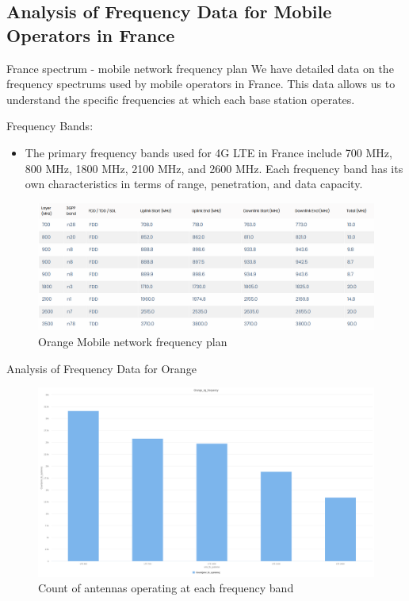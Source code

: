 \smallframetitle

\subsection{Analysis of Frequency Data for Mobile Operators in France}
\insertsubsectionframe

\begin{frame}{France spectrum - mobile network frequency plan}
    We have detailed data on the frequency spectrums used by mobile operators in France. This data allows us to understand the specific frequencies at which each base station operates.
    \begin{block}{Frequency Bands:}
        \begin{itemize}
            \item The primary frequency bands used for 4G LTE in France include 700 MHz, 800 MHz, 1800 MHz, 2100 MHz, and 2600 MHz.
            Each frequency band has its own characteristics in terms of range, penetration, and data capacity.
        \end{itemize}
    \end{block}
    \begin{figure}
        \includegraphics[height=0.4\paperheight]{images/Altair/Or_spectrum.png}
        \caption{Orange Mobile network frequency plan}
    \end{figure}
\end{frame}

\begin{frame}{Analysis of Frequency Data for Orange}
    \begin{figure}
        \includegraphics[height=0.6\paperheight]{images/Altair/Or_4g_freq_compar.png}
        \caption{Count of antennas operating at each frequency band}
    \end{figure}
\end{frame}

